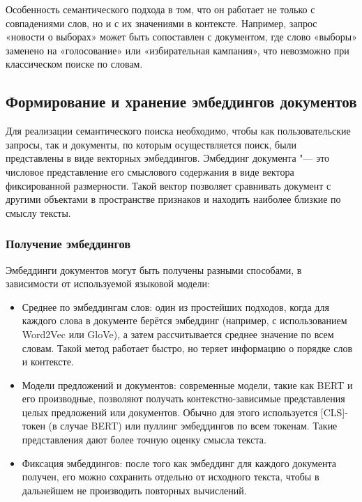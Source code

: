 \documentclass[coursework]{SCWorks}
\begin{document}
Особенность семантического подхода в том, что он работает не только с совпадениями слов, но и с их значениями в контексте. Например, запрос «новости о выборах» может быть сопоставлен с документом, где слово «выборы» заменено на «голосование» или «избирательная кампания», что невозможно при классическом поиске по словам.

\subsection{Формирование и хранение эмбеддингов документов}

Для реализации семантического поиска необходимо, чтобы как пользовательские запросы, так и документы, по которым осуществляется поиск, были представлены в виде векторных эмбеддингов. Эмбеддинг документа "--- это числовое представление его смыслового содержания в виде вектора фиксированной размерности. Такой вектор позволяет сравнивать документ с другими объектами в пространстве признаков и находить наиболее близкие по смыслу тексты.

\subsubsection{Получение эмбеддингов}
Эмбеддинги документов могут быть получены разными способами, в зависимости от используемой языковой модели:
\begin{itemize}
    \item 
    Среднее по эмбеддингам слов: один из простейших подходов, когда для каждого слова в документе берётся эмбеддинг (например, с использованием Word2Vec или GloVe), а затем рассчитывается среднее значение по всем словам. Такой метод работает быстро, но теряет информацию о порядке слов и контексте.
    
    \item Модели предложений и документов: современные модели, такие как BERT и его производные, позволяют получать контекстно-зависимые представления целых предложений или документов. Обычно для этого используется [CLS]-токен (в случае BERT) или пуллинг эмбеддингов по всем токенам. Такие представления дают более точную оценку смысла текста.
    
    \item Фиксация эмбеддингов: после того как эмбеддинг для каждого документа получен, его можно сохранить отдельно от исходного текста, чтобы в дальнейшем не производить повторных вычислений.
\end{itemize}
\end{document}
